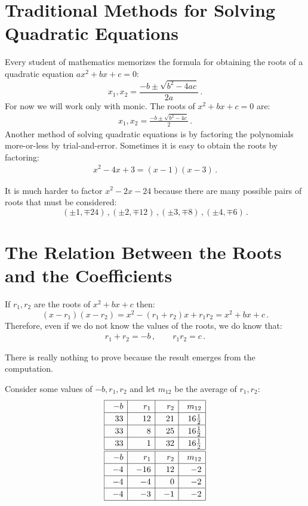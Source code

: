 \section{Traditional Methods for Solving Quadratic Equations}\label{s.traditional}
Every student of mathematics memorizes the formula for obtaining the roots of a quadratic equation $ax^2+bx+c=0$:
\[
x_1, x_2 = \frac{-b\pm\sqrt{b^2-4ac}}{2a}\,.
\]                      
For now we will work only with monic. The roots of $x^2+bx+c=0$ are:
\begin{align}
x_1, x_2 = \frac{-b\pm\sqrt{b^2-4c}}{2}\,.\label{eq.quadratic-roots}
\end{align}
Another method of solving quadratic equations is by factoring the polynomials more-or-less by trial-and-error. Sometimes it is easy to obtain the roots by factoring:
\begin{align}
x^2-4x+3= (x-1)(x-3)\label{eq.quadratic-lill}\,.
\end{align}


It is much harder to factor $x^2-2x-24$ because there are many possible pairs of roots that must be considered:
\[
(\pm 1,\mp 24)\,, (\pm 2,\mp 12)\,, (\pm 3,\mp 8)\,, (\pm 4,\mp 6)\,.
\]

\section{The Relation Between the Roots and the Coefficients}\label{s.computing}
\begin{theorem}\label{thm.roots-coefficients}
If $r_1,r_2$ are the roots of $x^2+bx+c$ then:
\[
(x-r_1)(x-r_2)=x^2 - (r_1+r_2)x + r_1r_2=x^2+bx+c\,.
\]
Therefore, even if we do not know the values of the roots, we do know that:
\begin{align}\label{eq.viete-quad}
r_1+r_2 = -b\,,\quad\quad r_1r_2=c\,.
\end{align}
\end{theorem}

There is really nothing to prove because the result emerges from the computation.

Consider some values of $-b,r_1,r_2$ and let $m_{12}$ be the average of $r_1,r_2$:
\[
\renewcommand{\arraystretch}{1.2}
\begin{array}{|@{\hspace{1em}}r|@{\hspace{1em}}r|@{\hspace{1em}}r|@{\hspace{1em}}r|}
\hline
-b& r_1 & r_2 &m_{12}\\\hline
33 & 12 & 21 & 16\frac{1}{2}\\\hline
33 & 8 & 25 & 16\frac{1}{2}\\\hline
33 & 1 & 32 & 16\frac{1}{2}\\\hline\hline
-b& r_1 & r_2 &m_{12}\\\hline
-4 & -16 & 12 & -2 \\\hline
-4 & -4 & 0 & -2 \\\hline
-4 & -3 & -1 & -2 \\\hline
\end{array}
\]

